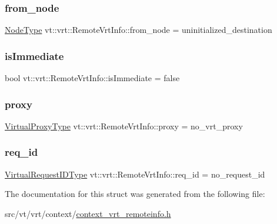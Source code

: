 \subsubsection{\texorpdfstring{from\+\_\+node}{from\_node}}
{\footnotesize\ttfamily \hyperlink{namespacevt_a866da9d0efc19c0a1ce79e9e492f47e2}{Node\+Type} vt\+::vrt\+::\+Remote\+Vrt\+Info\+::from\+\_\+node = uninitialized\+\_\+destination}

\mbox{\label{structvt_1_1vrt_1_1_remote_vrt_info_a7124ec26ebeb01fa37ad2d60e6ae7337}} 
\subsubsection{\texorpdfstring{is\+Immediate}{isImmediate}}
{\footnotesize\ttfamily bool vt\+::vrt\+::\+Remote\+Vrt\+Info\+::is\+Immediate = false}

\mbox{\label{structvt_1_1vrt_1_1_remote_vrt_info_ac36c0f40eac2a594ab1d4458f795e205}} 
\subsubsection{\texorpdfstring{proxy}{proxy}}
{\footnotesize\ttfamily \hyperlink{namespacevt_a1b417dd5d684f045bb58a0ede70045ac}{Virtual\+Proxy\+Type} vt\+::vrt\+::\+Remote\+Vrt\+Info\+::proxy = no\+\_\+vrt\+\_\+proxy}

\mbox{\label{structvt_1_1vrt_1_1_remote_vrt_info_a58e1d4f4c865256dae4f93aca489b61e}} 
\subsubsection{\texorpdfstring{req\+\_\+id}{req\_id}}
{\footnotesize\ttfamily \hyperlink{namespacevt_1_1vrt_ac7ef8820ebfc383fa16f09bf46eaa2b8}{Virtual\+Request\+I\+D\+Type} vt\+::vrt\+::\+Remote\+Vrt\+Info\+::req\+\_\+id = no\+\_\+request\+\_\+id}



The documentation for this struct was generated from the following file\+:\begin{DoxyCompactItemize}
\item 
src/vt/vrt/context/\hyperlink{context__vrt__remoteinfo_8h}{context\+\_\+vrt\+\_\+remoteinfo.\+h}\end{DoxyCompactItemize}
